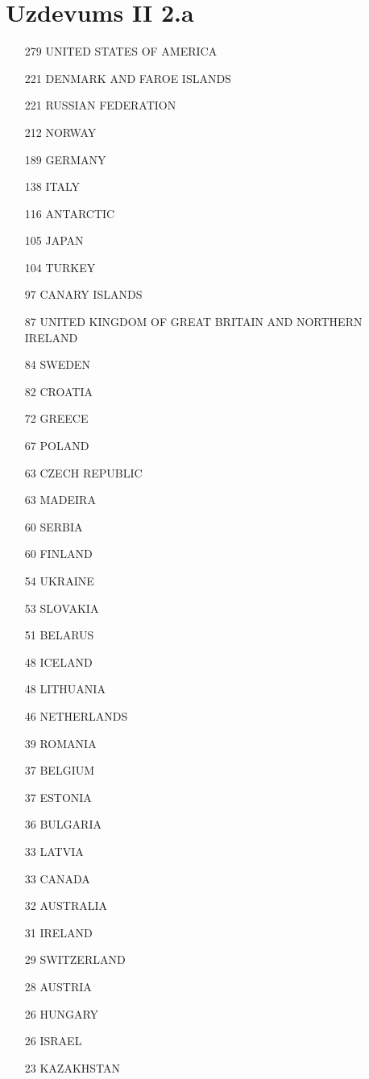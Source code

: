 \documentclass[12pt,a4paper]{article}
\begin{document}
\section{Uzdevums II 2.a}\label{ap:II 2.a}
\begin{multicols*}{3}
    \begin{itemize}
        \item[279] UNITED STATES OF AMERICA
\item[221] DENMARK AND FAROE ISLANDS
\item[221] RUSSIAN FEDERATION
\item[212] NORWAY
\item[189] GERMANY
\item[138] ITALY
\item[116] ANTARCTIC
\item[105] JAPAN
\item[104] TURKEY
\item[97] CANARY ISLANDS
\item[87] UNITED KINGDOM OF GREAT BRITAIN AND NORTHERN IRELAND
\item[84] SWEDEN
\item[82] CROATIA
\item[72] GREECE
\item[67] POLAND
\item[63] CZECH REPUBLIC
\item[63] MADEIRA
\item[60] SERBIA
\item[60] FINLAND
\item[54] UKRAINE
\item[53] SLOVAKIA
\item[51] BELARUS
\item[48] ICELAND
\item[48] LITHUANIA
\item[46] NETHERLANDS
\item[39] ROMANIA
\item[37] BELGIUM
\item[37] ESTONIA
\item[36] BULGARIA
\item[33] LATVIA
\item[33] CANADA
\item[32] AUSTRALIA
\item[31] IRELAND
\item[29] SWITZERLAND
\item[28] AUSTRIA
\item[26] HUNGARY
\item[26] ISRAEL
\item[23] KAZAKHSTAN

\end{itemize}
\end{multicols*}
\end{document}
